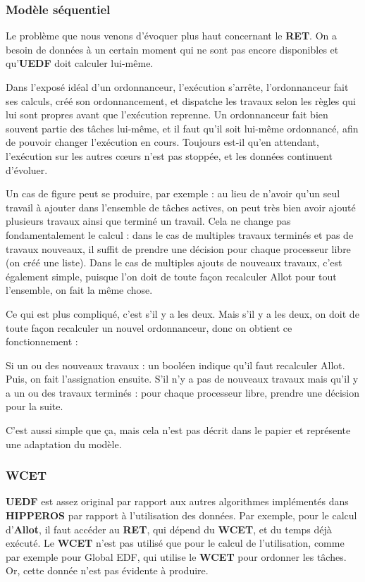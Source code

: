 	\subsubsection{Modèle séquentiel}
	
		Le problème que nous venons d'évoquer plus haut concernant le \textbf{RET}. On a besoin de données 
		à un certain moment qui ne sont pas encore disponibles et qu'\textbf{UEDF} doit calculer lui-même. 
		
		Dans l'exposé idéal d'un ordonnanceur, l'exécution s'arrête, l'ordonnanceur fait ses calculs, créé son 
		ordonnancement, et dispatche les travaux selon les règles qui lui sont propres avant que l'exécution reprenne. 
		Un ordonnanceur fait bien souvent partie des tâches lui-même, et il faut qu'il soit lui-même ordonnancé, 
		afin de pouvoir changer l'exécution en cours. Toujours est-il qu'en attendant, l'exécution sur les autres cœurs 
		n'est pas stoppée, et les données continuent d'évoluer. 
		
		Un cas de figure peut se produire, par exemple : au lieu de n'avoir qu'un seul travail à ajouter dans 
		l'ensemble de tâches actives, on peut très bien avoir ajouté plusieurs travaux ainsi que terminé un travail.
		Cela ne change pas fondamentalement le calcul : dans le cas de multiples travaux terminés et pas de travaux nouveaux, 
		il suffit de prendre une décision pour chaque processeur libre (on créé une liste).
		Dans le cas de multiples ajouts de nouveaux travaux, c'est également simple, puisque l'on 
		doit de toute façon recalculer Allot pour tout l'ensemble, on fait la même chose. 
		
		Ce qui est plus compliqué, c'est s'il y a les deux. Mais s'il y a les deux, on doit 
		de toute façon recalculer un nouvel ordonnanceur, donc on obtient ce fonctionnement :
		
		Si un ou des nouveaux travaux : un booléen indique qu'il faut recalculer Allot. Puis, 
		on fait l'assignation ensuite.
		S'il n'y a pas de nouveaux travaux mais qu'il y a un ou des travaux terminés :
		pour chaque processeur libre, prendre une décision pour la suite.\newline
		
		C'est aussi simple que ça, mais cela n'est pas décrit dans le papier et représente une 
		adaptation du modèle.
	
	
		
	\subsubsection{WCET}
		\textbf{UEDF} est assez original par rapport aux autres algorithmes implémentés dans \textbf{HIPPEROS} 
		par rapport à l'utilisation des données. Par exemple, pour le calcul d'\textbf{Allot}, il faut accéder 
		au \textbf{RET}, qui dépend du \textbf{WCET}, et du temps déjà exécuté. Le \textbf{WCET} n'est pas 
		utilisé que pour le calcul de l'utilisation, comme par exemple pour Global EDF, qui utilise 
		le \textbf{WCET }pour ordonner les tâches. Or, cette donnée n'est pas évidente à produire. \newline
		
